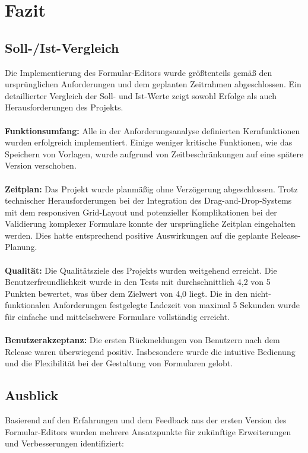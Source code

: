 \documentclass[a4paper,11pt]{article}
\begin{document}
\section{Fazit}
\subsection{Soll-/Ist-Vergleich}
Die Implementierung des Formular-Editors wurde größtenteils gemäß den ursprünglichen Anforderungen und dem geplanten Zeitrahmen abgeschlossen. Ein detaillierter Vergleich der Soll- und Ist-Werte zeigt sowohl Erfolge als auch Herausforderungen des Projekts.\\
\\
\noindent \textbf{Funktionsumfang:} Alle in der Anforderungsanalyse definierten Kernfunktionen wurden erfolgreich implementiert. Einige weniger kritische Funktionen, wie das Speichern von Vorlagen, wurde aufgrund von Zeitbeschränkungen auf eine spätere Version verschoben.\\
\\
\noindent \textbf{Zeitplan:} Das Projekt wurde planmäßig ohne Verzögerung abgeschlossen. Trotz technischer Herausforderungen bei der Integration des Drag-and-Drop-Systems mit dem responsiven Grid-Layout und potenzieller Komplikationen bei der Validierung komplexer Formulare konnte der ursprüngliche Zeitplan eingehalten werden. Dies hatte entsprechend positive Auswirkungen auf die geplante Release-Planung.\\
\\
\noindent \textbf{Qualität:} Die Qualitätsziele des Projekts wurden weitgehend erreicht. Die Benutzerfreundlichkeit wurde in den Tests mit durchschnittlich 4,2 von 5 Punkten bewertet, was über dem Zielwert von 4,0 liegt. Die in den nicht-funktionalen Anforderungen festgelegte Ladezeit von maximal 5 Sekunden wurde für einfache und mittelschwere Formulare vollständig erreicht.\\
\\

\noindent \textbf{Benutzerakzeptanz:} Die ersten Rückmeldungen von Benutzern nach dem Release waren überwiegend positiv. Insbesondere wurde die intuitive Bedienung und die Flexibilität bei der Gestaltung von Formularen gelobt.

\subsection{Ausblick}
Basierend auf den Erfahrungen und dem Feedback aus der ersten Version des Formular-Editors wurden mehrere Ansatzpunkte für zukünftige Erweiterungen und Verbesserungen identifiziert:
\end{document}

